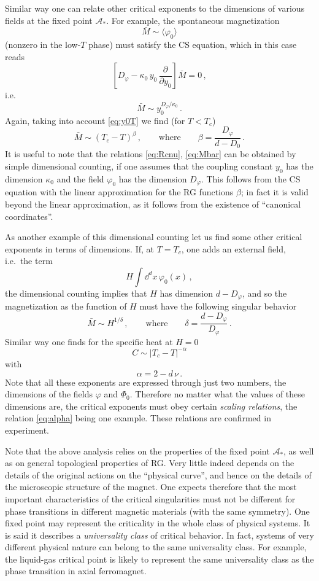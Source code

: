 Similar way one can relate other critical exponents to the dimensions of various
fields at the fixed point $\mathcal A_*$. For example, the spontaneous
magnetization
\[
\bar M\sim\langle\varphi_0\rangle
\]
(nonzero in the low-$T$ phase) must satisfy the CS equation, which in this case
reads
\[
\left[D_\varphi-\kappa_0\,y_0\,\frac\partial{\partial y_0}\right]\bar M=0\,,
\]
i.e.
\begin{equation}\label{eq:Mbar}
\bar M\sim y_0^{D_\varphi/\kappa_0}\,.
\end{equation}
Again, taking into account \eqref{eq:y0T} we find (for $T<T_c$)
\[
\bar M\sim(T_c-T)^\beta\,,\qquad\text{where}\qquad\beta=\frac{D_\varphi}{d-D_0}\,.
\]
It is useful to note that the relations \eqref{eq:Rcnu}, \eqref{eq:Mbar} can be
obtained by simple dimensional counting, if one assumes that the coupling constant
$y_0$ has the dimension $\kappa_0$ and the field $\varphi_0$ has the dimension
$D_\varphi$. This follows from the CS equation with the linear approximation for
the RG functions $\beta$; in fact it is valid beyond the linear approximation, as
it follows from the existence of ``canonical coordinates''.

As another example of this dimensional counting let us find some other critical
exponents in terms of dimensions. If, at $T=T_c$, one adds an external field,
i.e.\ the term
\[
H\int \dd^dx\,\varphi_0(x)\,,
\]
the dimensional counting implies that $H$ has dimension $d-D_\varphi$, and so the
magnetization as the function of $H$ must have the following singular behavior
\[
\bar M\sim H^{1/\delta}\,,\qquad\text{where}\qquad\delta=\frac{d-D_\varphi}{D_\varphi}\,.
\]
Similar way one finds for the specific heat at $H=0$
\[
C\sim|T_c-T|^{-\alpha}
\]
with
\begin{equation}\label{eq:alpha}
\alpha=2-d\,\nu\,.
\end{equation}
Note that all these exponents are expressed through just two numbers, the
dimensions of the fields $\varphi$ and $\Phi_0$. Therefore no matter what the
values of these dimensions are, the critical exponents must obey certain
\emph{scaling relations}, the relation \eqref{eq:alpha} being one example. These
relations are confirmed in experiment.

Note that the above analysis relies on the properties of the fixed point
$\mathcal A_*$, as well as on general topological properties of RG. Very little
indeed depends on the details of the original actions on the ``physical curve'',
and hence on the details of the microscopic structure of the magnet. One expects
therefore that the most important characteristics of the critical singularities
must not be different for phase transitions in different magnetic materials (with
the same symmetry). One fixed point may represent the criticality in the whole
class of physical systems. It is said it describes a \emph{universality class} of
critical behavior. In fact, systems of very different physical nature can belong
to the same universality class. For example, the liquid-gas critical point is
likely to represent the same universality class as the phase transition in axial
ferromagnet.


